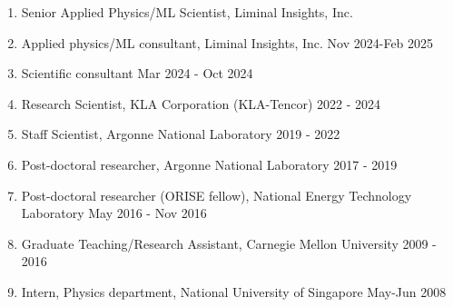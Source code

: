 \begin{enumerate}
    \item Senior Applied Physics/ML Scientist, Liminal Insights, Inc. 
    \item Applied physics/ML consultant, Liminal Insights, Inc. \hfill Nov 2024-Feb 2025
    \item Scientific consultant \hfill Mar 2024 - Oct 2024
    \item Research Scientist, KLA Corporation (KLA-Tencor) \hfill 2022 - 2024
    \item Staff Scientist, Argonne National Laboratory \hfill 2019 - 2022
    \item Post-doctoral researcher, Argonne National Laboratory \hfill 2017 - 2019
    \item Post-doctoral researcher (ORISE fellow), National Energy Technology Laboratory  \hfill May 2016 - Nov 2016
    \item Graduate Teaching/Research Assistant, Carnegie Mellon University \hfill 2009 - 2016
    \item Intern, Physics department, National University of Singapore \hfill May-Jun 2008 
\end{enumerate}